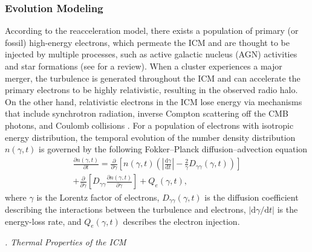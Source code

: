 \documentclass[twocolumn]{aastex62}
\newcommand{\R}[1]{\mathrm{#1}}
\newcommand{\D}[1]{\R{d} #1}
\newcommand{\diff}[2]{\frac{\D{#1}}{\D{#2}}}
\newcommand{\pdiff}[2]{\frac{\partial #1}{\partial #2}}
\newcounter{sssseccount}
\newcommand{\sssseclabel}{\alph{sssseccount}}
\newcommand{\ssssec}[1]{%
  \vspace{1ex}%
  \stepcounter{sssseccount}%
  \noindent\emph{\sssseclabel. #1}%
}
\begin{document}
\subsubsection{Evolution Modeling}
\label{sec:halo-evo}

According to the reacceleration model, there exists a population of
primary (or fossil) high-energy electrons, which permeate the ICM and
are thought to be injected by multiple processes, such as active
galactic nucleus (AGN) activities and star formations
(see \citealt{blasi2007rev} for a review).
When a cluster experiences a major merger, the turbulence is generated
throughout the ICM and can accelerate the primary electrons to be highly
relativistic, resulting in the observed radio halo.
On the other hand, relativistic electrons in the ICM lose energy via
mechanisms that include synchrotron radiation, inverse Compton scattering
off the CMB photons, and Coulomb collisions \citep{sarazin1999}.
For a population of electrons with isotropic energy distribution, the
temporal evolution of the number density distribution $n(\gamma, t)$
is governed by the following Fokker--Planck diffusion--advection equation
\citep{eilek1991,schlickeiser2002}
\begin{multline}
  \label{eq:fokkerplanck}
  \pdiff{n(\gamma,t)}{t} = \pdiff{}{\gamma} \left[ n(\gamma,t) \left(
      \left| \diff{\gamma}{t} \right| -
      \frac{2}{\gamma} D_{\gamma\gamma}(\gamma, t) \right) \right] \\
    + \pdiff{}{\gamma} \left[ D_{\gamma\gamma} \pdiff{n(\gamma,t)}{\gamma}
    \right] + Q_e(\gamma,t),
\end{multline}
where $\gamma$ is the Lorentz factor of electrons,
$D_{\gamma\gamma}(\gamma, t)$ is the diffusion coefficient describing
the interactions between the turbulence and electrons,
$|\R{d}\gamma / \R{d}t|$ is the energy-loss rate,
and $Q_e(\gamma, t)$ describes the electron injection.

\setcounter{sssseccount}{0}
\ssssec{Thermal Properties of the ICM}
\end{document}
